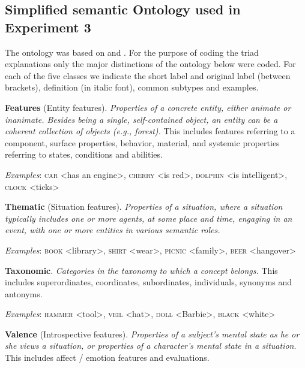 \documentclass[doc]{apa6}
\newcommand{\stimulus}[1]{\textsc{#1}}
\begin{document}
\begin{appendix}
\clearpage



\section{Simplified semantic Ontology used in Experiment 3}
\label{Appendix:SemanticOntology}

\small{
The ontology was based on \textcite{DeDeyne2008b} and \textcite{Wu2009}. For the purpose of coding the triad explanations only the major distinctions of the ontology below were coded. For each of the five classes we indicate the short label and original label (between brackets), definition (in italic font), common subtypes and examples.

\bigskip



\noindent\textbf{Features} (Entity features).
\noindent\textit{Properties of a concrete entity, either animate or inanimate. Besides being a single, self-contained object, an entity can be a coherent collection of objects (e.g., forest).} This includes features referring to a component, surface properties, behavior, material, and systemic properties referring to states, conditions and abilities.

\noindent\textit{Examples}:
\stimulus{car} <has an engine>, \stimulus{cherry} <is red>, \stimulus{dolphin} <is intelligent>, \stimulus{clock} <ticks>

\noindent\textbf{Thematic} (Situation features).
\noindent\textit{Properties of a situation, where a situation typically includes one or more agents, at some place and time, engaging in an event, with one or more entities in various semantic roles.}

\noindent\textit{Examples}:  \stimulus{book} <library>, \stimulus{shirt} <wear>, \stimulus{picnic} <family>, \stimulus{beer} <hangover>

\smallskip

\noindent\textbf{Taxonomic}.
\textit{Categories in the taxonomy to which a concept belongs. }
This includes superordinates, coordinates, subordinates, individuals, synonyms and antonyms.

\noindent\textit{Examples}:
\stimulus{hammer} <tool>, \stimulus{veil} <hat>, \stimulus{doll} <Barbie>, \stimulus{black} <white>

\smallskip

\noindent\textbf{Valence} (Introspective features).
\noindent\textit{Properties of a subject's mental state as he or she views a situation, or properties of a character's mental state in a situation}. This includes affect / emotion features and evaluations.

}
\end{appendix}
\end{document}
